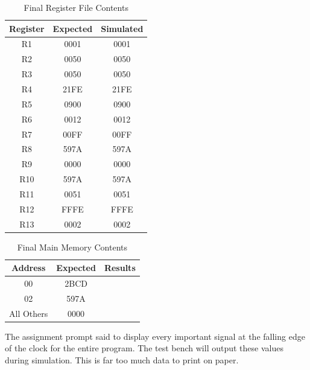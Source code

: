         \begin{table}[htbp]
        	   \caption{Final Register File Contents}
        	   \label{results}
        	   \centering
        	   \begin{tabular}{ c | c | c}
        	   Register         & Expected & Simulated   \\
        	   \hline
        	   R1  &   0001     &   0001        \\
               R2  &   0050     &   0050        \\
               R3  &   0050     &   0050        \\
               R4  &   21FE     &   21FE        \\
               R5  &   0900     &   0900        \\
               R6  &   0012     &   0012        \\
               R7  &   00FF     &   00FF        \\
               R8  &   597A     &   597A        \\
               R9  &   0000     &   0000        \\
               R10 &   597A     &   597A        \\
               R11 &   0051     &   0051        \\
               R12 &   FFFE     &   FFFE        \\
               R13 &   0002     &   0002        \\
        	   \end{tabular}
        	\end{table}
            \begin{table}[htbp]
               \caption{Final Main Memory Contents}
               \label{fmainme}
               \centering
               \begin{tabular}{ c | c | c }
               Address         & Expected & Results    \\
               \hline
               00  &   2BCD            \\
               02  &   597A            \\
               All Others  &   0000    \\
               
               \end{tabular}
            \end{table}
            The assignment prompt said to display every important signal at the falling
            edge of the clock for the entire program. The test bench will output these values
            during simulation. This is far too much data to print on paper.
             
